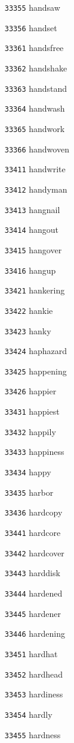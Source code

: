 \documentclass[twoside,11pt]{article}
\begin{document}
\begin{multicols}{5}
\begin{enumerate}
\item[\texttt{33355}] handsaw
\item[\texttt{33356}] handset
\item[\texttt{33361}] handsfree
\item[\texttt{33362}] handshake
\item[\texttt{33363}] handstand
\item[\texttt{33364}] handwash
\item[\texttt{33365}] handwork
\item[\texttt{33366}] handwoven
\item[\texttt{33411}] handwrite
\item[\texttt{33412}] handyman
\item[\texttt{33413}] hangnail
\item[\texttt{33414}] hangout
\item[\texttt{33415}] hangover
\item[\texttt{33416}] hangup
\item[\texttt{33421}] hankering
\item[\texttt{33422}] hankie
\item[\texttt{33423}] hanky
\item[\texttt{33424}] haphazard
\item[\texttt{33425}] happening
\item[\texttt{33426}] happier
\item[\texttt{33431}] happiest
\item[\texttt{33432}] happily
\item[\texttt{33433}] happiness
\item[\texttt{33434}] happy
\item[\texttt{33435}] harbor
\item[\texttt{33436}] hardcopy
\item[\texttt{33441}] hardcore
\item[\texttt{33442}] hardcover
\item[\texttt{33443}] harddisk
\item[\texttt{33444}] hardened
\item[\texttt{33445}] hardener
\item[\texttt{33446}] hardening
\item[\texttt{33451}] hardhat
\item[\texttt{33452}] hardhead
\item[\texttt{33453}] hardiness
\item[\texttt{33454}] hardly
\item[\texttt{33455}] hardness

\end{enumerate}
\end{multicols}
\end{document}
